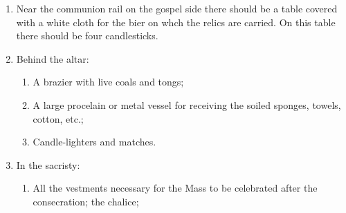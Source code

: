 \documentclass[letterpaper]{report}
\begin{document}
{\begin{enumerate}[label=\Roman*.]
\begin{enumerate}[label=\arabic*.]
                \item A quantity of incense to refill the boat;

                \item A little basin containing a small quantity of cement;

                \item A small trowel;

                \item Ewer, basin, towels and a salver with cotton and alcohol
                    swabs;

                \item Five small crosses made of wax tapers (\textit{about 6
                    inches long}), with five large grains of incense at each of 
                    the ends and at the center of each of the crosses.

            \end{enumerate}

        \item Near the communion rail on the gospel side there should be a
            table covered with a white cloth for the bier on whch the relics
            are carried. On this table there should be four candlesticks.


        \item Behind the altar:

            \begin{enumerate}[label=\arabic*.]

                \item A brazier with live coals and tongs;

                \item A large procelain or metal vessel for receiving the
                    soiled sponges, towels, cotton, etc.;

                \item Candle-lighters and matches.

            \end{enumerate}

        \item In the sacristy:

            \begin{enumerate}[label=\arabic*.]

                \item All the vestments necessary for the Mass to be celebrated
                    after the consecration; the chalice;


\end{enumerate}
\end{enumerate}}
\end{document}
